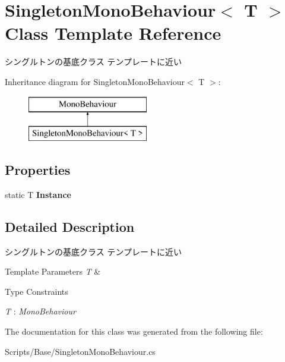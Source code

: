\hypertarget{class_singleton_mono_behaviour}{}\section{Singleton\+Mono\+Behaviour$<$ T $>$ Class Template Reference}
\label{class_singleton_mono_behaviour}


シングルトンの基底クラス テンプレートに近い  


Inheritance diagram for Singleton\+Mono\+Behaviour$<$ T $>$\+:\begin{figure}[H]
\begin{center}
\leavevmode
\includegraphics[height=2.000000cm]{class_singleton_mono_behaviour}
\end{center}
\end{figure}
\subsection*{Properties}
\begin{DoxyCompactItemize}
\item 
static T {\bfseries Instance}\hypertarget{class_singleton_mono_behaviour_a2e1b552aa6b4ed45e1039c0d3d31a05a}{}\label{class_singleton_mono_behaviour_a2e1b552aa6b4ed45e1039c0d3d31a05a}

\end{DoxyCompactItemize}


\subsection{Detailed Description}
シングルトンの基底クラス テンプレートに近い 


\begin{DoxyTemplParams}{Template Parameters}
{\em T} & \\
\hline
\end{DoxyTemplParams}
\begin{Desc}
\item[Type Constraints]\begin{description}
\item[{\em T} : {\em Mono\+Behaviour}]\end{description}
\end{Desc}


The documentation for this class was generated from the following file\+:\begin{DoxyCompactItemize}
\item 
Scripts/\+Base/Singleton\+Mono\+Behaviour.\+cs\end{DoxyCompactItemize}
